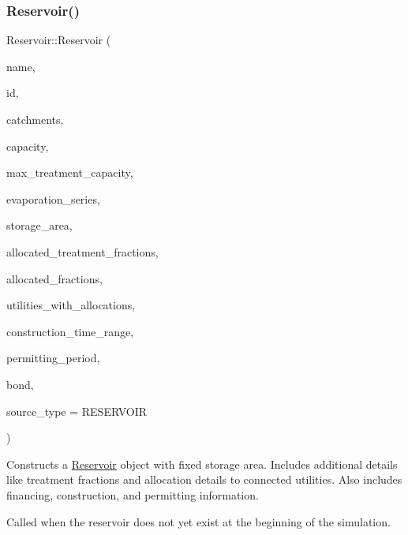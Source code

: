 \subsubsection{\texorpdfstring{Reservoir()}{Reservoir()}\hspace{0.1cm}{\footnotesize\ttfamily [8/9]}}
{\footnotesize\ttfamily Reservoir\+::\+Reservoir (\begin{DoxyParamCaption}\item[{const char $\ast$}]{name,  }\item[{const int}]{id,  }\item[{const vector$<$ \mbox{\hyperlink{classCatchment}{Catchment}} $\ast$$>$ \&}]{catchments,  }\item[{const double}]{capacity,  }\item[{const double}]{max\+\_\+treatment\+\_\+capacity,  }\item[{\mbox{\hyperlink{classEvaporationSeries}{Evaporation\+Series}} \&}]{evaporation\+\_\+series,  }\item[{double}]{storage\+\_\+area,  }\item[{vector$<$ double $>$ $\ast$}]{allocated\+\_\+treatment\+\_\+fractions,  }\item[{vector$<$ double $>$ $\ast$}]{allocated\+\_\+fractions,  }\item[{vector$<$ int $>$ $\ast$}]{utilities\+\_\+with\+\_\+allocations,  }\item[{const vector$<$ double $>$ \&}]{construction\+\_\+time\+\_\+range,  }\item[{double}]{permitting\+\_\+period,  }\item[{\mbox{\hyperlink{classBond}{Bond}} \&}]{bond,  }\item[{int}]{source\+\_\+type = {\ttfamily RESERVOIR} }\end{DoxyParamCaption})}



Constructs a \mbox{\hyperlink{classReservoir}{Reservoir}} object with fixed storage area. Includes additional details like treatment fractions and allocation details to connected utilities. Also includes financing, construction, and permitting information. 

Called when the reservoir does not yet exist at the beginning of the simulation.


